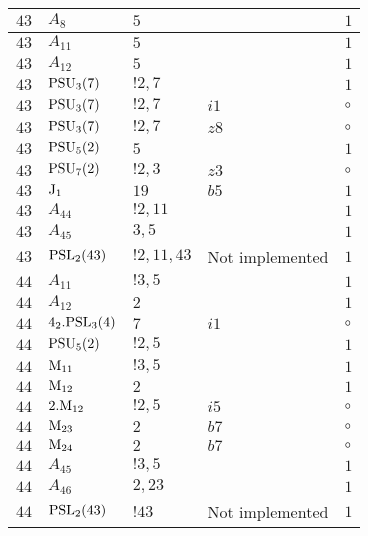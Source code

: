 \documentclass[a4paper, 11pt]{article}
\begin{document}
\begin{longtable}{lllll}
        $ 43 $ & $ A_{8} $ & $ 5 $ & $ ~ $ & $ 1$ \\ \hline
        $ 43 $ & $ A_{11} $ & $ 5 $ & $ ~ $ & $ 1$ \\ \hline
        $ 43 $ & $ A_{12} $ & $ 5 $ & $ ~ $ & $ 1$ \\ \hline
        $ 43 $ & $ {\rm PSU}_{3}(7) $ & $ ! 2,7 $ & $ ~ $ & $ 1$ \\ \hline
        $ 43 $ & $ {\rm PSU}_{3}(7) $ & $ ! 2,7 $ & $ i1 $ &  $\circ$ \\ \hline
        $ 43 $ & $ {\rm PSU}_{3}(7) $ & $ ! 2,7 $ & $ z8 $ &  $\circ$ \\ \hline
        $ 43 $ & $ {\rm PSU}_{5}(2) $ & $ 5 $ & $ ~ $ & $ 1$ \\ \hline
        $ 43 $ & $ {\rm PSU}_{7}(2) $ & $ ! 2,3 $ & $ z3 $ &  $\circ$ \\ \hline
        $ 43 $ & $ {\rm J}_1 $ & $ 19 $ & $ b5 $ & $ 1$ \\ \hline
        $ 43 $ & $ A_{44} $ & $ !2, 11 $ & $ ~ $ & $ 1$ \\ \hline
        $ 43 $ & $ A_{45} $ & $ 3, 5 $ & $ ~ $ & $ 1$ \\ \hline
        $ 43 $ & $ {\rm PSL}_{2}(43) $ & $ !2, 11, 43 $ &  Not implemented & $ 1$ \\ \hline
        $ 44 $ & $ A_{11} $ & $ ! 3,5 $ & $ ~ $ & $ 1$ \\ \hline
        $ 44 $ & $ A_{12} $ & $ 2 $ & $ ~ $ & $ 1$ \\ \hline
        $ 44 $ & $ 4_2.{\rm PSL}_{3}(4) $ & $ 7 $ & $ i1 $ &  $\circ$ \\ \hline
        $ 44 $ & $ {\rm PSU}_{5}(2) $ & $ ! 2,5 $ & $ ~ $ & $ 1$ \\ \hline
        $ 44 $ & $ {\rm M}_{11} $ & $ ! 3,5 $ & $ ~ $ & $ 1$ \\ \hline
        $ 44 $ & $ {\rm M}_{12} $ & $ 2 $ & $ ~ $ & $ 1$ \\ \hline
        $ 44 $ & $ 2.{\rm M}_{12} $ & $ ! 2,5 $ & $ i5 $ &  $\circ$ \\ \hline
        $ 44 $ & $ {\rm M}_{23} $ & $ 2 $ & $ b7 $ &  $\circ$ \\ \hline
        $ 44 $ & $ {\rm M}_{24} $ & $ 2 $ & $ b7 $ &  $\circ$ \\ \hline
        $ 44 $ & $ A_{45} $ & $ !3, 5 $ & $ ~ $ & $ 1$ \\ \hline
        $ 44 $ & $ A_{46} $ & $ 2, 23 $ & $ ~ $ & $ 1$ \\ \hline
        $ 44 $ & $ {\rm PSL}_{2}(43) $ & $ !43 $ &  Not implemented & $ 1$ \\ \hline

\end{longtable}
\end{document}

